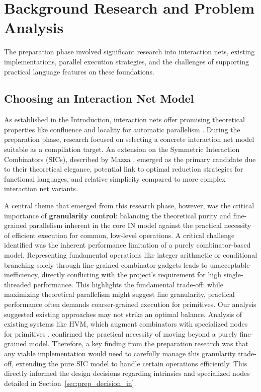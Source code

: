 \section{Background Research and Problem Analysis}\label{sec:prep_research}

The preparation phase involved significant research into interaction nets, existing implementations, parallel execution strategies, and the challenges of supporting practical language features on these foundations.

\subsection{Choosing an Interaction Net Model}\label{sec:prep_research_in}

As established in the Introduction, interaction nets offer promising theoretical properties like confluence and locality for automatic parallelism \cite{lafont1990interactionnets}. During the preparation phase, research focused on selecting a concrete interaction net model suitable as a compilation target. An extension on the Symmetric Interaction Combinators (SICs), described by Mazza \cite{mazza}, emerged as the primary candidate due to their theoretical elegance, potential link to optimal reduction strategies for functional languages, and relative simplicity compared to more complex interaction net variants.

A central theme that emerged from this research phase, however, was the critical importance of \textbf{granularity control}: balancing the theoretical purity and fine-grained parallelism inherent in the core IN model against the practical necessity of efficient execution for common, low-level operations. A critical challenge identified was the inherent performance limitation of a purely combinator-based model. Representing fundamental operations like integer arithmetic or conditional branching solely through fine-grained combinator gadgets leads to unacceptable inefficiency, directly conflicting with the project's requirement for high single-threaded performance. This highlights the fundamental trade-off: while maximizing theoretical parallelism might suggest fine granularity, practical performance often demands coarser-grained execution for primitives. Our analysis suggested existing approaches may not strike an optimal balance. Analysis of existing systems like HVM, which augment combinators with specialized nodes for primitives \cite{HVMGithub}, confirmed the practical necessity of moving beyond a purely fine-grained model. Therefore, a key finding from the preparation research was that any viable implementation would need to carefully manage this granularity trade-off, extending the pure SIC model to handle certain operations efficiently. This directly informed the design decisions regarding intrinsics and specialized nodes detailed in Section~\ref{sec:prep_decision_in}.

